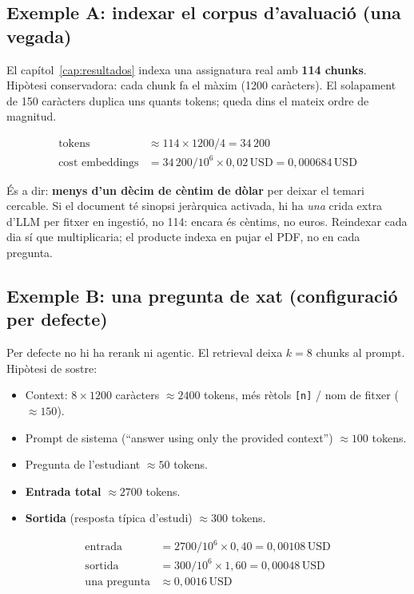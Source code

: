 \subsection{Exemple A: indexar el corpus d'avaluació (una vegada)}

El capítol~\ref{cap:resultados} indexa una assignatura real amb \textbf{114 chunks}. Hipòtesi conservadora: cada chunk fa el màxim (1200 caràcters). El solapament de 150 caràcters duplica uns quants tokens; queda dins el mateix ordre de magnitud.

\begin{align*}
\text{tokens} &\approx 114 \times 1200 / 4 = 34\,200 \\
\text{cost embeddings} &= 34\,200 / 10^{6} \times 0{,}02\,\mathrm{USD} = 0{,}000684\,\mathrm{USD}
\end{align*}

És a dir: \textbf{menys d'un dècim de cèntim de dòlar} per deixar el temari cercable. Si el document té sinopsi jeràrquica activada, hi ha \emph{una} crida extra d'LLM per fitxer en ingestió, no 114: encara és cèntims, no euros. Reindexar cada dia sí que multiplicaria; el producte indexa en pujar el PDF, no en cada pregunta.

\subsection{Exemple B: una pregunta de xat (configuració per defecte)}

Per defecte no hi ha rerank ni agentic. El retrieval deixa $k{=}8$ chunks al prompt. Hipòtesi de sostre:

\begin{itemize}
  \item Context: $8 \times 1200$ caràcters $\approx 2400$ tokens, més rètols \texttt{[n]} / nom de fitxer ($\approx 150$).
  \item Prompt de sistema (``answer using only the provided context'') $\approx 100$ tokens.
  \item Pregunta de l'estudiant $\approx 50$ tokens.
  \item \textbf{Entrada total} $\approx 2700$ tokens.
  \item \textbf{Sortida} (resposta típica d'estudi) $\approx 300$ tokens.
\end{itemize}

\begin{align*}
\text{entrada} &= 2700 / 10^{6} \times 0{,}40 = 0{,}00108\,\mathrm{USD} \\
\text{sortida} &= 300 / 10^{6} \times 1{,}60 = 0{,}00048\,\mathrm{USD} \\
\text{una pregunta} &\approx 0{,}0016\,\mathrm{USD}
\end{align*}

